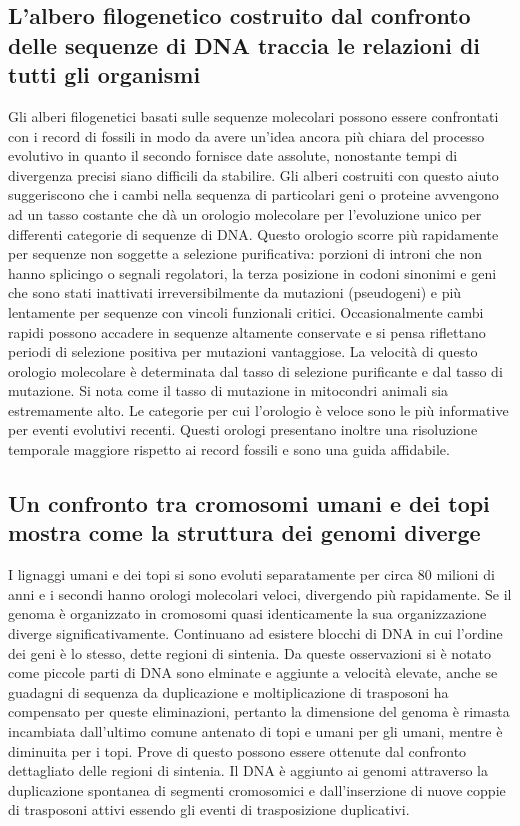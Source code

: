 \subsection{L'albero filogenetico costruito dal confronto delle sequenze di DNA traccia le relazioni di tutti gli organismi}
Gli alberi filogenetici basati sulle sequenze molecolari possono essere confrontati con i record di fossili in modo da avere un'idea ancora pi\`u chiara del processo evolutivo in quanto
il secondo fornisce date assolute, nonostante tempi di divergenza precisi siano difficili da stabilire. Gli alberi costruiti con questo aiuto suggeriscono che i cambi nella sequenza
di particolari geni o proteine avvengono ad un tasso costante che d\`a un orologio molecolare per l'evoluzione unico per differenti categorie di sequenze di DNA. Questo orologio scorre 
pi\`u rapidamente per sequenze non soggette a selezione purificativa: porzioni di introni che non hanno splicingo o segnali regolatori, la terza posizione in codoni sinonimi e geni
che sono stati inattivati irreversibilmente da mutazioni (pseudogeni) e pi\`u lentamente per sequenze con vincoli funzionali critici. Occasionalmente cambi rapidi possono accadere in
sequenze altamente conservate e si pensa riflettano periodi di selezione positiva per mutazioni vantaggiose. La velocit\`a di questo orologio molecolare \`e determinata dal tasso di 
selezione purificante e dal tasso di mutazione. Si nota come il tasso di mutazione in mitocondri animali sia estremamente alto. Le categorie per cui l'orologio \`e veloce sono le pi\`u 
informative per eventi evolutivi recenti. Questi orologi presentano inoltre una risoluzione temporale maggiore rispetto ai record fossili e sono una guida affidabile. 
\subsection{Un confronto tra cromosomi umani e dei topi mostra come la struttura dei genomi diverge}
I lignaggi umani e dei topi si sono evoluti separatamente per circa $80$ milioni di anni e i secondi hanno orologi molecolari veloci, divergendo pi\`u rapidamente. Se il genoma \`e 
organizzato in cromosomi quasi identicamente la sua organizzazione diverge significativamente. Continuano ad esistere blocchi di DNA in cui l'ordine dei geni \`e lo stesso, dette regioni
di sintenia. Da queste osservazioni si \`e notato come piccole parti di DNA sono elminate e aggiunte a velocit\`a elevate, anche se guadagni di sequenza da duplicazione e moltiplicazione
di trasposoni ha compensato per queste eliminazioni, pertanto la dimensione del genoma \`e rimasta incambiata dall'ultimo comune antenato di topi e umani per gli umani, mentre \`e 
diminuita per i topi. Prove di questo possono essere ottenute dal confronto dettagliato delle regioni di sintenia. Il DNA \`e aggiunto ai genomi attraverso la duplicazione spontanea
di segmenti cromosomici e dall'inserzione di nuove coppie di trasposoni attivi essendo gli eventi di trasposizione duplicativi. 
